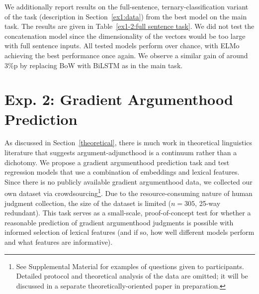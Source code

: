 \documentclass[letterpaper]{article} %
\begin{document}
We additionally report results on the full-sentence, ternary-classification variant of the task (description in Section~\ref{ex1:data}) from the best model on the main task. The results are given in Table~\ref{ex1-2:full sentence task}. We did not test the concatenation model since the dimensionality of the vectors would be too large with full sentence inputs. All tested models perform over chance, with ELMo achieving the best performance once again. We observe a similar gain of around 3\%p by replacing BoW with BiLSTM as in the main task.

\section{Exp. 2: Gradient Argumenthood Prediction}
As discussed in Section~\ref{theoretical}, there is much work in theoretical linguistics literature that suggests argument-adjuncthood is a continuum rather than a dichotomy. We propose a gradient argumenthood prediction task and test regression models that use a combination of embeddings and lexical features. Since there is no publicly available gradient argumenthood data, we collected our own dataset via crowdsourcing\footnote{See Supplemental Material for examples of questions given to participants. Detailed protocol and theoretical analysis of the data are omitted; it will be discussed in a separate theoretically-oriented paper in preparation.}. Due to the resource-consuming nature of human judgment collection, the size of the dataset is limited ($n=305$, 25-way redundant). This task serves as a small-scale, proof-of-concept test for whether a reasonable prediction of gradient argumenthood judgments is possible with informed selection of lexical features (and if so, how well different models perform and what features are informative).
\end{document}
